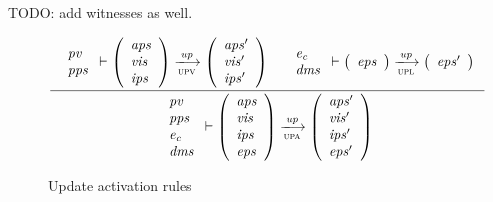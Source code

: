 \begin{todo}
TODO: add witnesses as well.
\end{todo}

\begin{figure}[htb]
  \begin{equation}
    \label{eq:rule:up-activation}
    \inference
    {
      {
        \begin{array}{l}
          \var{pv}\\
          \var{pps}
        \end{array}
      }
      \vdash
      {
        \left(
          \begin{array}{l}
            \var{aps}\\
            \var{vis}\\
            \var{ips}
          \end{array}
        \right)
      }
      \trans{upv}{\var{up}}
      {
        \left(
          \begin{array}{l}
            \var{aps'}\\
            \var{vis'}\\
            \var{ips'}
          \end{array}
        \right)
      }
      &
      {\begin{array}{l}
          \var{e_c}\\
          \var{dms}
        \end{array}
      }
      \vdash
      {
        \left(
          \begin{array}{l}
            \var{eps}
          \end{array}
        \right)
      }
      \trans{upl}{\var{up}}
      {
        \left(
          \begin{array}{l}
            \var{eps'}
          \end{array}
        \right)
      }
    }
    {
      {
        \begin{array}{l}
          \var{pv}\\
          \var{pps}\\
          \var{e_c}\\
          \var{dms}
        \end{array}
      }
      \vdash
      {
        \left(
          \begin{array}{l}
            \var{aps}\\
            \var{vis}\\
            \var{ips}\\
            \var{eps}
          \end{array}
        \right)
      }
      \trans{upa}{\var{up}}
      {
        \left(
          \begin{array}{l}
            \var{aps'}\\
            \var{vis'}\\
            \var{ips'}\\
            \var{eps'}
          \end{array}
        \right)
      }
    }
  \end{equation}
  \caption{Update activation rules}
  \label{fig:rules:up-activation}
\end{figure}

